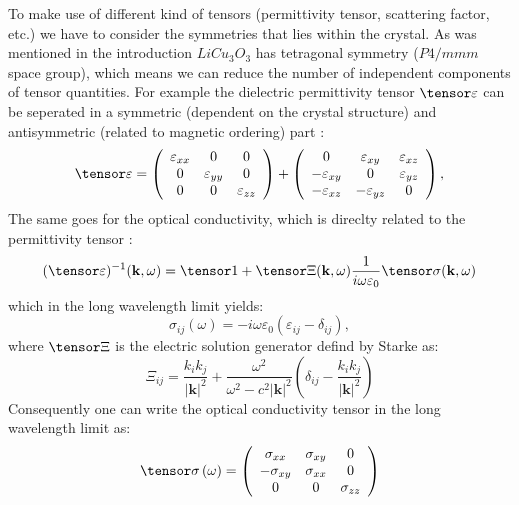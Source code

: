 \documentclass[twocolumn,amsmath,superscriptaddress,amssymb]{revtex4-1}
\let\vec\mathbf
\begin{document}
To make use of different kind of tensors (permittivity tensor, scattering factor, etc.) we have to consider the symmetries that lies within the crystal. As was mentioned in the introduction $LiCu_3 O_3$ has tetragonal symmetry ($P4/mmm$ space group), which means we can reduce the number of independent components of tensor quantities. For example the dielectric permittivity tensor $\tensor\varepsilon$ can be seperated in a symmetric (dependent on the crystal structure) and antisymmetric (related to magnetic ordering) part \cite{Yang}:
\begin{equation}
\tensor\varepsilon=\left(
\begin{array}{ccc}
\varepsilon_{xx}&0&0\\
0&\varepsilon_{yy}&0\\
0&0&\varepsilon_{zz}
\end{array}\right)+\left(
\begin{array}{ccc}
0&\varepsilon_{xy}&\varepsilon_{xz}\\
-\varepsilon_{xy}&0&\varepsilon_{yz}\\
-\varepsilon_{xz}&-\varepsilon_{yz}&0
\end{array}\right),
\end{equation}
\noindent The same goes for the optical conductivity, which is direclty related to the permittivity tensor \cite{Starke,Starke2}:
\begin{equation}
(\tensor \varepsilon)^{-1}(\vec{k},\omega)=\tensor 1 + \tensor \Xi (\vec{k},\omega)\frac{1}{i\omega\varepsilon_0}\tensor\sigma(\vec{k},\omega)
\end{equation}
%
\noindent which in the long wavelength limit yields:
\begin{equation}\label{DielOpt}
\sigma_{ij}(\omega)=-i\omega\varepsilon_0(\varepsilon_{ij}-\delta_{ij}),
\end{equation}
%
\noindent where $\tensor\Xi$ is the electric solution generator defind by Starke \cite{Starke} as:
\begin{equation}
\Xi_{ij} = \frac{k_ik_j}{\left|\vec{k}\right|^2} + \frac{\omega^2}{\omega^2-c^2\left|\vec{k}\right|^2}\left(\delta_{ij}-\frac{k_ik_j}{\left|\vec{k}\right|^2}\right)
\end{equation}
%
\indent Consequently one can write the optical conductivity tensor in the long wavelength limit as:
\begin{equation}
\tensor \sigma\left(\omega\right) = \left(
\begin{array}{ccc}
\sigma_{xx}&\sigma_{xy}&0 \\
-\sigma_{xy}&\sigma_{xx}&0\\
0&0&\sigma_{zz}
\end{array} \right)
\end{equation}
\end{document}
